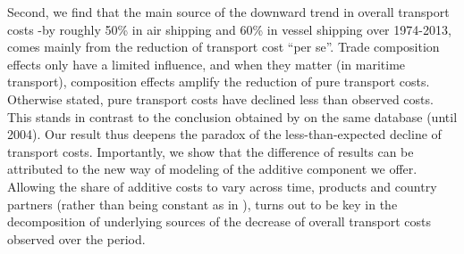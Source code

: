 \documentclass[a4paper,11pt]{article}
\begin{document}
Second, we find that the main source of the downward trend in overall transport costs -by roughly 50\% in air shipping and 60\% in vessel shipping over 1974-2013, comes mainly from the reduction of transport cost ``per se''.
Trade composition effects only have a limited influence, and when they matter (in maritime transport), composition effects amplify the reduction of pure transport costs.
Otherwise stated, pure transport costs have declined less than observed costs.
This stands in contrast to the conclusion obtained by \cite{hummels2007} on the same database (until 2004).
Our result thus deepens the paradox of the less-than-expected decline of transport costs.
Importantly, we show that the difference of results can be attributed to the new way of modeling of the additive component we offer.
Allowing the share of additive costs to vary across time, products and country partners (rather than being constant as in \citealp{hummels2007}), turns out to be key in the decomposition of underlying sources of the decrease of overall transport costs observed over the period.
\smallskip
\end{document}
